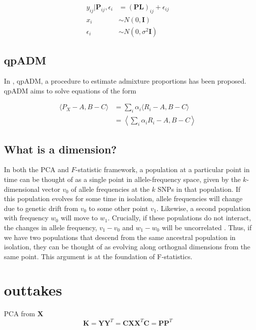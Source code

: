 \documentclass[12pt,a4pape, fullpage]{article}
\newcommand{\MX}{\mathbf{X}} %
\newcommand{\MC}{\mathbf{C}} %
\newcommand{\MY}{\mathbf{Y}} %
\newcommand{\MP}{\mathbf{P}} %
\newcommand{\ML}{\mathbf{L}} %
\newcommand{\MK}{\mathbf{K}} %
\begin{document}
	\begin{align}
	    y_{ij} | \MP_{ij}, \epsilon_i &= (\MP\ML)_{ij} + \epsilon_{ij}\nonumber\\
	    x_i & \sim N(0, \mathbf{I}) \nonumber\\
	    \epsilon_i &\sim N(0, \sigma^2 \mathbf{I})\nonumber
	\end{align}
	
	\subsection{qpADM}
	In \cite{haak2015}, qpADM, a procedure to estimate admixture proportions has been proposed. qpADM aims to solve equations of the form
	
	\begin{align}
	\langle P_X - A, B -C \rangle &= \sum_i  \alpha_i\langle R_i - A, B - C \rangle \nonumber\\
	&= \left\langle \sum_i  \alpha_i R_i - A, B - C \right\rangle
	\end{align}
	
	
	\subsection{What is a dimension?}
	In both the PCA and $F$-statistic framework, a population at  a particular point in time can be thought of as a single point in allele-frequency space, given by the $k$-dimensional vector $v_0$ of allele frequencies at the $k$ SNPs in that population. If this population evolves for some time in isolation, allele frequencies will change due to genetic drift from $v_0$ to some other point $v_1$. Likewise, a second population with frequency $w_0$ will move to $w_1$. Crucially, if these populations do not interact, the changes in allele frequency, $v_1 - v_0$ and $w_1 - w_0$ will be uncorrelated \cite{patterson2012}. Thus, if we have two populations that descend from the same ancestral population in isolation, they can be thought of as evolving along orthognal dimensions from the same point. This argument is at the foundation of F-statistics.
	
	
	\section{outtakes}
	PCA from $\MX$
	\begin{equation}
	\MK = \MY \MY^T = \MC\MX\MX^T \MC = \MP\MP^T
	\end{equation}
\end{document}
